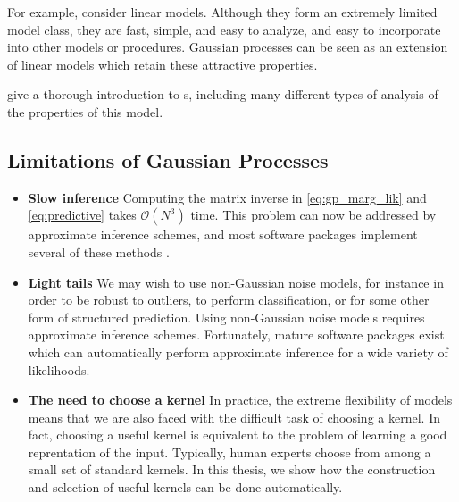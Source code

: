 \begin{itemize}
For example, consider linear models.
Although they form an extremely limited model class, they are fast, simple, and easy to analyze, and easy to incorporate into other models or procedures.
Gaussian processes can be seen as an extension of linear models which retain these attractive properties.

\citet{rasmussen38gaussian} give a thorough introduction to \gp{}s, including many different types of analysis of the properties of this model.

\end{itemize}




\subsection{Limitations of Gaussian Processes}

\begin{itemize}

\item {\bf Slow inference}
Computing the matrix inverse in \eqref{eq:gp_marg_lik} and \eqref{eq:predictive} takes $\mathcal{O}(N^3)$ time.
This problem can now be addressed by approximate inference schemes, \citep{snelson2006sparse, quinonero2005unifying, hensman2013gaussian} and most \gp{} software packages implement several of these methods \citep{GPML, VanRiiHarJylVeh14}.

\item {\bf Light tails}
We may wish to use non-Gaussian noise models, for instance in order to be robust to outliers, to perform classification, or for some other form of structured prediction.
Using non-Gaussian noise models requires approximate inference schemes.
Fortunately, mature software packages exist which can automatically perform approximate inference for a wide variety of likelihoods.

\item {\bf The need to choose a kernel}
In practice, the extreme flexibility of \gp{} models means that we are also faced with the difficult task of choosing a kernel.
In fact, 
choosing a useful kernel is equivalent to the problem of learning a good reprentation of the input.
Typically, human experts choose from among a small set of standard kernels.
In this thesis, we show how the construction and selection of useful kernels can be done automatically.
\end{itemize}





